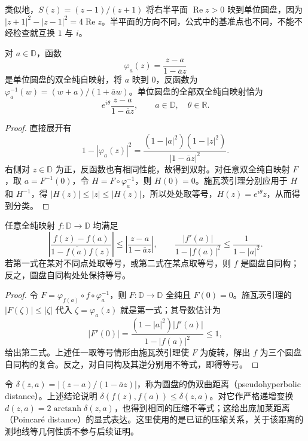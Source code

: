 类似地，$S(z)=(z-1)/(z+1)$ 将右半平面 $\operatorname{Re}z>0$ 映到单位圆盘，因为 $|z+1|^2-|z-1|^2=4\operatorname{Re}z$。半平面的方向不同，公式中的基准点也不同，不能不经检查就互换 $1$ 与 $i$。

\begin{proposition}[圆盘自同构]
\label{prop:ca-disk-auto}
对 $a\in\mathbb D$，函数
\[
 \varphi_a(z)=\frac{z-a}{1-\overline a z}
\]
是单位圆盘的双全纯自映射，将 $a$ 映到 $0$，反函数为 $\varphi_a^{-1}(w)=(w+a)/(1+\overline a w)$。单位圆盘的全部双全纯自映射恰为
\[
 e^{i\theta}\frac{z-a}{1-\overline a z},\qquad a\in\mathbb D,\quad\theta\in\mathbb R.
\]
\end{proposition}
\begin{proof}
直接展开有
\begin{equation}
 1-|\varphi_a(z)|^2
 =\frac{(1-|a|^2)(1-|z|^2)}{|1-\overline a z|^2}.
 \label{eq:ca-disk-auto}
\end{equation}
右侧对 $z\in\mathbb D$ 为正，反函数也有相同性能，故得到双射。对任意双全纯自映射 $F$，取 $a=F^{-1}(0)$，令 $H=F\circ\varphi_a^{-1}$，则 $H(0)=0$。施瓦茨引理分别应用于 $H$ 和 $H^{-1}$，得 $|H(z)|\le|z|\le|H(z)|$，所以处处取等号，$H(z)=e^{i\theta}z$，从而得到分类。
\end{proof}

\begin{theorem}
\label{thm:ca-schwarz-pick}
任意全纯映射 $f:\mathbb D\to\mathbb D$ 均满足
\[
 \left|\frac{f(z)-f(a)}{1-\overline{f(a)}f(z)}\right|
 \le\left|\frac{z-a}{1-\overline a z}\right|,
 \qquad
 \frac{|f'(a)|}{1-|f(a)|^2}\le\frac1{1-|a|^2}.
\]
若第一式在某对不同点处取等号，或第二式在某点取等号，则 $f$ 是圆盘自同构；反之，圆盘自同构处处保持等号。
\end{theorem}
\begin{proof}
令 $F=\varphi_{f(a)}\circ f\circ\varphi_a^{-1}$，则 $F:\mathbb D\to\mathbb D$ 全纯且 $F(0)=0$。施瓦茨引理的 $|F(\zeta)|\le|\zeta|$ 代入 $\zeta=\varphi_a(z)$ 就是第一式；其导数估计为
\[
 |F'(0)|=\frac{(1-|a|^2)|f'(a)|}{1-|f(a)|^2}\le1,
\]
给出第二式。上述任一取等号情形由施瓦茨引理使 $F$ 为旋转，解出 $f$ 为三个圆盘自同构的复合。反之，对自同构及其逆分别用不等式，即得等号。
\end{proof}

令 $\delta(z,a)=|(z-a)/(1-\overline a z)|$，称为圆盘的伪双曲距离（pseudohyperbolic distance）。上述结论说明 $\delta(f(z),f(a))\le\delta(z,a)$。对它作严格递增变换 $d(z,a)=2\operatorname{arctanh}\delta(z,a)$，也得到相同的压缩不等式；这给出庞加莱距离（Poincar\'e distance）的显式表达。这里使用的是已证的压缩关系，关于该距离的测地线等几何性质不参与后续证明。

